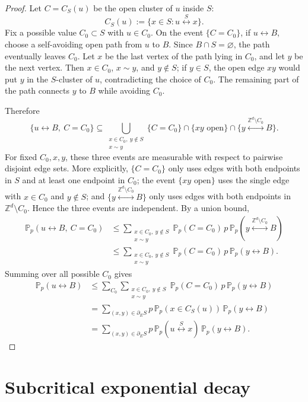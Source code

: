 \documentclass[11pt]{article}
\newcommand{\Z}{\mathbb Z}
\newcommand{\Pp}{\mathbb P_p}
\newcommand{\conn}{\longleftrightarrow}
\begin{document}
\begin{proof}
Let $C=C_S(u)$ be the open cluster of $u$ inside $S$:
\[
 C_S(u):=\{x\in S:u\stackrel{S}{\conn}x\}.
\]
Fix a possible value $C_0\subset S$ with $u\in C_0$. On the event $\{C=C_0\}$, if $u\conn B$, choose a self-avoiding open path from $u$ to $B$. Since $B\cap S=\varnothing$, the path eventually leaves $C_0$. Let $x$ be the last vertex of the path lying in $C_0$, and let $y$ be the next vertex. Then $x\in C_0$, $x\sim y$, and $y\notin S$; if $y\in S$, the open edge $xy$ would put $y$ in the $S$-cluster of $u$, contradicting the choice of $C_0$. The remaining part of the path connects $y$ to $B$ while avoiding $C_0$.

Therefore
\[
 \{u\conn B,\ C=C_0\}
 \subseteq
 \bigcup_{\substack{x\in C_0,\ y\notin S\\x\sim y}}
 \{C=C_0\}\cap\{xy\text{ open}\}\cap\{y\stackrel{\Z^d\setminus C_0}{\conn}B\}.
\]
For fixed $C_0,x,y$, these three events are measurable with respect to pairwise disjoint edge sets. More explicitly, $\{C=C_0\}$ only uses edges with both endpoints in $S$ and at least one endpoint in $C_0$; the event $\{xy\text{ open}\}$ uses the single edge with $x\in C_0$ and $y\notin S$; and $\{y\stackrel{\Z^d\setminus C_0}{\conn}B\}$ only uses edges with both endpoints in $\Z^d\setminus C_0$. Hence the three events are independent. By a union bound,
\begin{align*}
 \Pp(u\conn B,\ C=C_0)
 &\le
 \sum_{\substack{x\in C_0,\ y\notin S\\x\sim y}}
 \Pp(C=C_0)\,p\,\Pp(y\stackrel{\Z^d\setminus C_0}{\conn}B)\\
 &\le
 \sum_{\substack{x\in C_0,\ y\notin S\\x\sim y}}
 \Pp(C=C_0)\,p\,\Pp(y\conn B).
\end{align*}
Summing over all possible $C_0$ gives
\begin{align*}
 \Pp(u\conn B)
 &\le
 \sum_{C_0}
 \sum_{\substack{x\in C_0,\ y\notin S\\x\sim y}}
 \Pp(C=C_0)\,p\,\Pp(y\conn B)\\
 &=
 \sum_{(x,y)\in\partial_E S}
 p\,\Pp(x\in C_S(u))\,\Pp(y\conn B)\\
 &=
 \sum_{(x,y)\in\partial_E S}
 p\,\Pp(u\stackrel{S}{\conn}x)\,\Pp(y\conn B).
\end{align*}
\end{proof}

\section{Subcritical exponential decay}
\end{document}
